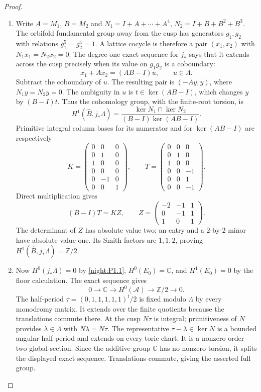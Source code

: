 \documentclass[11pt,a4paper]{article}
\numberwithin{equation}{section}
\theoremstyle{definition}
\begin{document}
\begin{proof}
\begin{enumerate}[label=\arabic*.]
\item Write $A=M_1$, $B=M_2$ and
$N_1=I+A+\cdots+A^4$, $N_2=I+B+B^2+B^3$.
The orbifold fundamental group away from the cusp has generators
$g_1,g_2$ with relations $g_1^5=g_2^4=1$.  A lattice cocycle is
therefore a pair $(x_1,x_2)$ with $N_1x_1=N_2x_2=0$.
The degree-one exact sequence for $j_*$ says that it extends across
the cusp precisely when its value on $g_1g_2$ is a coboundary:
\[
x_1+Ax_2=(AB-I)u,\qquad u\in\Lambda.
\]
Subtract the coboundary of $u$.  The resulting pair is $(-Ay,y)$,
where $N_1y=N_2y=0$.  The ambiguity in $u$ is
$t\in\ker(AB-I)$, which changes $y$ by $(B-I)t$.
Thus the cohomology group, with the finite-root torsion, is
\[
H^1(\widehat B,j_*\Lambda)=
\frac{\ker N_1\cap\ker N_2}{(B-I)\ker(AB-I)}.
\]
Primitive integral column bases for its numerator and for
$\ker(AB-I)$ are respectively
\[
K=\begin{pmatrix}
0&0&0\\0&1&0\\1&0&0\\0&0&0\\0&-1&0\\0&0&1
\end{pmatrix},\qquad
T=\begin{pmatrix}
0&0&0\\0&1&0\\1&0&0\\0&0&-1\\0&0&1\\0&0&-1
\end{pmatrix}.
\]
Direct multiplication gives
\[
(B-I)T=KZ,\qquad
Z=\begin{pmatrix}-2&-1&1\\0&-1&1\\1&0&1\end{pmatrix}.
\]
The determinant of $Z$ has absolute value two; an entry and a
$2$-by-$2$ minor have absolute value one.  Its Smith factors are
$1,1,2$, proving $H^1(\widehat B,j_*\Lambda)=\mathbb Z/2$.
\item Now $H^0(j_*\Lambda)=0$ by \cref{night:P1.1},
$H^0(E_0)=\mathbb C$, and $H^1(E_0)=0$ by the floor
calculation. The exact sequence gives
\[
0\to\mathbb C\to H^0(\mathcal A)\to\mathbb Z/2\to0.
\]
The half-period
$\tau=(0,1,1,1,1,1)^t/2$ is fixed modulo $\Lambda$
by every monodromy matrix. It extends over the finite
quotients because the translations commute there.
At the cusp $N\tau$ is integral; primitiveness of $N$
provides $\lambda\in\Lambda$ with $N\lambda=N\tau$.
The representative $\tau-\lambda\in\ker N$ is a bounded
angular half-period and extends on every toric chart.
It is a nonzero order-two global section. Since the
additive group $\mathbb C$ has no nonzero torsion, it
splits the displayed exact sequence. Translations
commute, giving the asserted full group.


\end{enumerate}
\end{proof}
\end{document}

